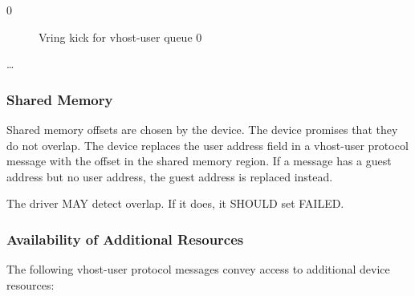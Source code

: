 \begin{description}
\item[0] Vring kick for vhost-user queue 0
\item[\ldots]
\end{description}

\subsubsection{Shared Memory}\label{sec:Device Types / Vhost-Guest Device / Additional Resources / Shared Memory}

Shared memory offsets are chosen by the device. The device
promises that they do not overlap. The device replaces the user
address field in a vhost-user protocol message with the offset in
the shared memory region. If a message has a guest address but no
user address, the guest address is replaced instead.

The driver MAY detect overlap. If it does, it SHOULD set FAILED.

\subsubsection{Availability of Additional Resources}\label{sec:Device Types / Vhost-Guest Device / Additional Resources / Availability of Additional Resources}

The following vhost-user protocol messages convey access to
additional device resources:

